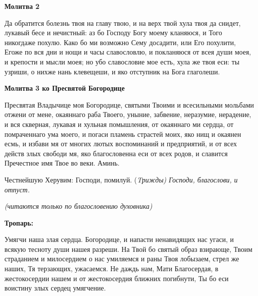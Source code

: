 \medskip


\bfseries Молитва 2\normalfont{}


Да обратится болезнь твоя на главу твою, и на верх твой хула твоя да снидет, лукавый бесе и нечистный: аз бо Господу Богу моему кланяюся, и Того никогдаже похулю. Како бо ми возможно Сему досадити, или Его похулити, Егоже по вся дни и нощи и часы славословлю, и покланяюся от всея ду­ши моея, и крепости и мысли моея; но убо славословие мое есть, хула же твоя еси: ты узриши, о нихже нань клевещеши, и яко от­ступник на Бога глаголеши.


\medskip


\bfseries Молитва 3 ко Пресвятой Богородице\normalfont{}


Пресвятая Владычице моя Богородице, святыми Твоими и всесильными мольбами отжени от мене, окаяннаго раба Твоего, уны­ние, забвение, неразумие, нерадение, и вся скверная, лукавая и хульная помышления, от окаяннаго ми сердца, от помраченнаго ума моего, и погаси пламень страстей моих, яко нищ и окаянен есмь, и избави мя от мно­гих лютых воспоминаний и предприятий, и от всех действ злых свободи мя, яко благо­словенна еси от всех родов, и славится Пречестное имя Твое во веки. Аминь.

Честнейшую Херувим: Господи, помилуй. (\itshape Tрижды\normalfont{}) Господи, благослови, \itshape и отпуст.\normalfont{}


\mychapterending

 


\itshape (читаются только по благословению духовника)\normalfont{}


\medskip


\bfseries Тропарь:\normalfont{}


Умягчи наша злая сердца. Богородице, и напасти ненавидящих нас угаси, и всякую тесноту души нашея разреши. На Твой бо святый образ взирающе, Твоим страданием и милосердием о нас умиляемся и раны Твоя лобызаем, стрел же наших, Тя терзающих, ужасаемся. Не даждь нам, Мати Благосердая, в жестокосердии нашем и от жестокосердия ближних погибнути, Ты бо еси воистину злых сердец умягчение.


\mychapterending